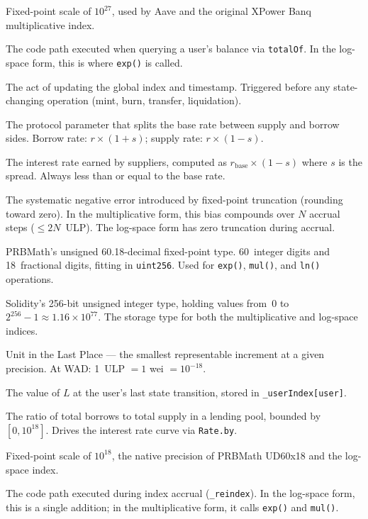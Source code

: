 \documentclass[10pt,a4paper,twocolumn]{article}
\theoremstyle{definition}
\theoremstyle{plain}
\theoremstyle{remark}
\begin{document}
\begin{description}[style=nextline, font=\normalfont\bfseries, leftmargin=1.5em]
\item[RAY] Fixed-point scale of $10^{27}$, used by Aave and the original XPower Banq multiplicative index.

\item[Read Path] The code path executed when querying a user's balance via \texttt{totalOf}. In the log-space form, this is where \texttt{exp()} is called.

\item[Reindex] The act of updating the global index and timestamp. Triggered before any state-changing operation (mint, burn, transfer, liquidation).

\item[Spread ($s$)] The protocol parameter that splits the base rate between supply and borrow sides. Borrow rate: $r \times (1 + s)$; supply rate: $r \times (1 - s)$.

\item[Supply Rate] The interest rate earned by suppliers, computed as $r_{\text{base}} \times (1 - s)$ where $s$ is the spread. Always less than or equal to the base rate.

\item[Truncation Bias] The systematic negative error introduced by fixed-point truncation (rounding toward zero). In the multiplicative form, this bias compounds over $N$ accrual steps ($\leq 2N$~ULP). The log-space form has zero truncation during accrual.

\item[UD60x18] PRBMath's unsigned 60.18-decimal fixed-point type. 60~integer digits and 18~fractional digits, fitting in \texttt{uint256}. Used for \texttt{exp()}, \texttt{mul()}, and \texttt{ln()} operations.

\item[uint256] Solidity's 256-bit unsigned integer type, holding values from~0 to $2^{256} - 1 \approx 1.16 \times 10^{77}$. The storage type for both the multiplicative and log-space indices.

\item[ULP] Unit in the Last Place --- the smallest representable increment at a given precision. At WAD: 1~ULP $= 1$ wei $= 10^{-18}$.

\item[User Snapshot ($L_u$)] The value of $L$ at the user's last state transition, stored in \texttt{\_userIndex[user]}.

\item[Utilization] The ratio of total borrows to total supply in a lending pool, bounded by $[0, 10^{18}]$. Drives the interest rate curve via \texttt{Rate.by}.

\item[WAD] Fixed-point scale of $10^{18}$, the native precision of PRBMath UD60x18 and the log-space index.

\item[Write Path] The code path executed during index accrual (\texttt{\_reindex}). In the log-space form, this is a single addition; in the multiplicative form, it calls \texttt{exp()} and \texttt{mul()}.

\end{description}

\clearpage
\ifodd\value{page}\else\thispagestyle{empty}\null\clearpage\fi
\end{document}
